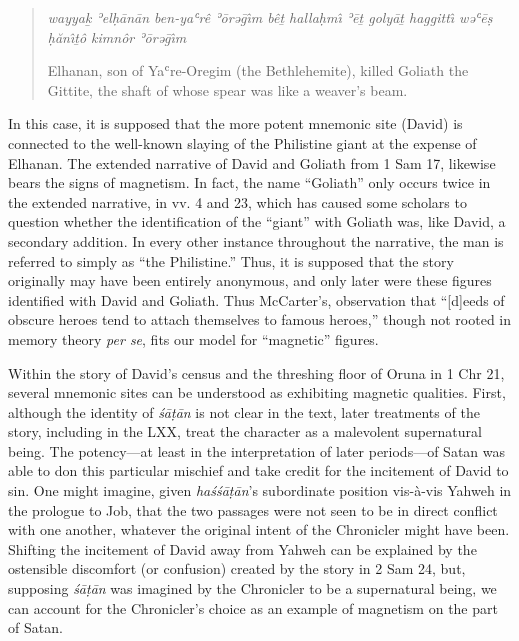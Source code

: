 \begin{quote}
\emph{wayyaḵ ʾelḥānān ben-yaʿrê ʾōrəḡı̂m bêṯ hallaḥmı̂ ʾēṯ golyāṯ haggittı̂
wəʿēṣ ḥănı̂ṯô kimnôr ʾōrəḡı̂m}

Elhanan, son of Yaʿre-Oregim (the Bethlehemite), killed Goliath the
Gittite, the shaft of whose spear was like a weaver's beam.
\end{quote}

In this case, it is supposed that the more potent mnemonic site (David)
is connected to the well-known slaying of the Philistine giant at the
expense of Elhanan. The extended narrative of David and Goliath from 1
Sam 17, likewise bears the signs of magnetism. In fact, the name
``Goliath'' only occurs twice in the extended narrative, in vv. 4 and
23, which has caused some scholars to question whether the
identification of the ``giant'' with Goliath was, like David, a
secondary addition. In every other instance throughout the narrative,
the man is referred to simply as ``the Philistine.'' Thus, it is
supposed that the story originally may have been entirely anonymous, and
only later were these figures identified with David and
Goliath.\autocites[For a fuller account of the textual issues
surrounding the main narrative about David and Goliath,
see,][280--309]{mccarter1980}[and][69--77]{mckenzie2000} Thus
McCarter's, observation that ``{[}d{]}eeds of obscure heroes tend to
attach themselves to famous heroes,''\autocite[450]{mccarter1984} though
not rooted in memory theory \emph{per se}, fits our model for
``magnetic'' figures.

Within the story of David's census and the threshing floor of Oruna in 1
Chr 21, several mnemonic sites can be understood as exhibiting magnetic
qualities. First, although the identity of \emph{śāṭān} is not clear in
the text, later treatments of the story, including in the LXX, treat the
character as a malevolent supernatural being. The potency---at least in
the interpretation of later periods---of Satan was able to don this
particular mischief and take credit for the incitement of David to sin.
One might imagine, given \emph{haśśāṭān}'s subordinate position
vis-à-vis Yahweh in the prologue to Job, that the two passages were not
seen to be in direct conflict with one another, whatever the original
intent of the Chronicler might have been. Shifting the incitement of
David away from Yahweh can be explained by the ostensible discomfort (or
confusion) created by the story in 2 Sam 24, but, supposing \emph{śāṭān}
was imagined by the Chronicler to be a supernatural being, we can
account for the Chronicler's choice as an example of magnetism on the
part of Satan.

